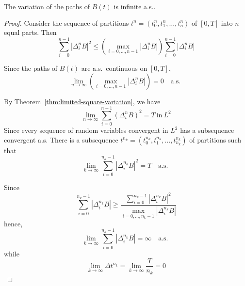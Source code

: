 \begin{theorem}
	The variation of the paths of $B(t)$ is infinite a.s..
\end{theorem}

\begin{proof}
	Consider the sequence of partitions $t^{n}=\left(t_{0}^{n},t_{1}^{n},\ldots,t_{n}^{n}\right)$ of $[0,T]$ into $n$ equal parts. Then
	\begin{equation*}
		\sum_{i=0}^{n-1}\left|\Delta_{i}^{n}B\right|^{2}\leq\left(\max_{i=0,\ldots,n-1}\left|\Delta_{i}^{n}B\right|\right)\sum_{i=0}^{n-1}\left|\Delta_{i}^{n}B\right|
	\end{equation*}

	Since the paths of $B(t)$ are a.s.\ continuous on $[0,T]$,
	\begin{equation*}
		\lim_{n\rightarrow\infty}\left(\max_{i=0,\ldots,n-1}\left|\Delta_{i}^{n}B\right|\right)=0\quad\text{a.s. }
	\end{equation*}

	By Theorem~\ref{thm:limited-square-variation}, we have
	\begin{equation*}
		\lim_{n\rightarrow\infty}\sum_{i=0}^{n-1}\left(\Delta_{i}^{n}B\right)^{2}=T\ \text{in}\ L^{2}
	\end{equation*}
	Since every sequence of random variables convergent in $L^{2}$ has a subsequence convergent a.s. There is a subsequence $t^{n_{k}}=\left(t_{0}^{n_{k}},t_{1}^{n_{k}},\ldots,t_{n_{k}}^{n_{k}}\right)$ of partitions such that
	\begin{equation*}
		\lim_{k\rightarrow\infty}\sum_{i=0}^{n_{k}-1}\left|\Delta_{i}^{n_{k}}B\right|^{2}=T\quad\text{a.s. }
	\end{equation*}

	Since
	\begin{equation*}
		\sum_{i=0}^{n_{k}-1}\left|\Delta_{i}^{n_{k}}B\right|\geq\frac{\sum_{i=0}^{n_{k}-1}\left|\Delta_{i}^{n_{k}}B\right|^{2}}{\max_{i=0,\ldots,n_{k}-1}\left|\Delta_{i}^{n_{k}}B\right|}
	\end{equation*}
	hence,
	\begin{equation*}
		\lim_{k\rightarrow\infty}\sum_{i=0}^{n_{k}-1}\left|\Delta_{i}^{n_{k}}B\right|=\infty\quad\text{a.s. }
	\end{equation*}
	while
	\begin{equation*}
		\lim_{k\rightarrow\infty}\Delta t^{n_{k}}=\lim_{k\rightarrow\infty}\frac{T}{n_{k}}=0
	\end{equation*}
\end{proof}

